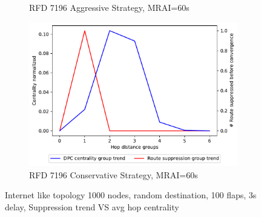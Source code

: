 \begin{figure}[H]
\begin{subfigure}[b]{0.325\textwidth}
         \caption{RFD 7196 Aggressive Strategy, MRAI=60s}
         \label{fig:1000_7196RFDA_centVSsup_elephants}
     \end{subfigure}
     \hfill
     \begin{subfigure}[b]{0.325\textwidth}
         \centering
         \includegraphics[width=\textwidth]{images/RFD/miceVSelephants/MultiMRAI/60/elephants/cisco_1000_RFD_7196_conservative_nodeConvergence_centVSsup_trend.pdf}
         \caption{RFD 7196 Conservative Strategy, MRAI=60s}
         \label{fig:1000_7196RFDC_centVSsup_elephants}
     \end{subfigure}
        \caption{Internet like topology 1000 nodes, random destination, 100 flaps, 3s delay, Suppression trend VS avg hop centrality}
        \label{fig:1000_RFD_centVSsup_elephants}
\end{figure}
